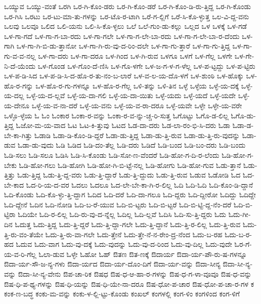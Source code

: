 {ಒಯ್ಯುವ
ಒಯ್ಯು-ವಂತೆ
ಒರಗಿ
ಒರ-ಗಿ-ಕೊಂ-ಡರು
ಒರ-ಗಿ-ಕೊಂ-ಡರೆ
ಒರ-ಗಿ-ಕೊಂ-ಡಿ-ರು-ತ್ತಿದ್ದ
ಒರ-ಗಿ-ಕೊಂಡು
ಒರ-ಗಿಸಿ
ಒರಟು
ಒರ-ಟು-ಮಾ-ತು-ಗಳನ್ನು
ಒರ-ಟೊ-ರ-ಟಾಗಿ
ಒರೆ-ಗ-ಲ್ಲಿಗೆ
ಒರೆ-ಸಿ-ಕೊ-ಳ್ಳುತ್ತ
ಒಲ-ವಿ-ದ್ದ-ವನು
ಒಲವು
ಒಲವೂ
ಒಲಿದ
ಒಲಿ-ಯನು
ಒಲಿ-ಸಿ-ಕೊ-ಳ್ಳಲು
ಒಲೆ
ಒಲೆ-ಗುಂ-ಡು-ಕಲ್ಲು
ಒಲ್ಲದ
ಒಳ
ಒಳಕ್ಕೆ
ಒಳ-ಗಡೆ
ಒಳ-ಗಾ-ಗದೆ
ಒಳ-ಗಾ-ಗ-ಬಾ-ರದು
ಒಳ-ಗಾ-ಗಲೇ
ಒಳ-ಗಾ-ಗ-ಲೇ-ಬಾ-ರದು
ಒಳ-ಗಾ-ಗ-ಲೇ-ಬಾ-ರ-ದೆಂದು
ಒಳ-ಗಾಗಿ
ಒಳ-ಗಾ-ಗಿ-ಬಿ-ಡು-ತ್ತಾನೋ
ಒಳ-ಗಾ-ಗಿ-ರು-ವು-ದ-ರಿಂ-ದಲೇ
ಒಳ-ಗಾ-ಗು-ತ್ತಾರೆ
ಒಳ-ಗಾ-ಗು-ತ್ತಿದ್ದ
ಒಳ-ಗಾ-ಗು-ವ-ವ-ನಲ್ಲ
ಒಳ-ಗಾ-ದರು
ಒಳ-ಗಾ-ದರೂ
ಒಳ-ಗಿಂದ
ಒಳ-ಗಿ-ರುವ
ಒಳಗೂ
ಒಳಗೆ
ಒಳ-ಗೆಲ್ಲ
ಒಳಗೇ
ಒಳ-ಗೇ-ನಿ-ದೆ-ಯೆಂದು
ಒಳ-ಗೊಂಡ
ಒಳ-ಗೊಂ-ದೆ-ಣಿಸಿ
ಒಳ-ಗೊ-ಳಗೇ
ಒಳ-ಜ-ಗ-ಳ-ಗ-ಳೆಲ್ಲ
ಒಳ-ಪ-ಟ್ಟದ್ದು
ಒಳ-ಪ-ಟ್ಟಿರು
ಒಳ-ಪ-ಡಿ-ಸಿದ
ಒಳ-ಪ-ಡಿ-ಸಿ-ದ-ಹೊ-ರ-ತು-ನಂ-ಬ-ಲಾರೆ
ಒಳ-ವ-ಲ-ಯ-ದೊ-ಳಗೆ
ಒಳ-ಶುಂಠಿ
ಒಳ-ಹೊಕ್ಕು
ಒಳ-ಹೊ-ರ-ಗನ್ನು
ಒಳ-ಹೊ-ರ-ಗು-ಗಳನ್ನೂ
ಒಳ-ಹೊ-ರ-ಗೆಲ್ಲ
ಒಳಿ-ತನ್ನು
ಒಳಿ-ತಿನ
ಒಳ್ಳೆ
ಒಳ್ಳೆಯ
ಒಳ್ಳೆ-ಯ-ದಕ್ಕೆ
ಒಳ್ಳೆ-ಯ-ದಲ್ಲ
ಒಳ್ಳೆ-ಯ-ದ-ಲ್ಲವೆ
ಒಳ್ಳೆ-ಯ-ದಾ-ಗಲಿ
ಒಳ್ಳೆ-ಯ-ದಾ-ಯಿತು
ಒಳ್ಳೆ-ಯದು
ಒಳ್ಳೆ-ಯದೆ
ಒಳ್ಳೆ-ಯದೇ
ಒಳ್ಳೆ-ಯ-ದೇನೂ
ಒಳ್ಳೆ-ಯ-ವ-ನಾ-ದರೆ
ಒಳ್ಳೆ-ಯ-ವನು
ಒಳ್ಳೆ-ಯ-ವ-ರಾ-ದರೂ
ಒಳ್ಳೆ-ಯವೇ
ಒಳ್ಳೇ
ಒಳ್ಳೇ-ಯ-ವರೇ
ಒಳ್ಳೊ-ಳ್ಳೆಯ
ಓ
ಓಂ
ಓಂಕಾರ
ಓಂಕಾ-ರ-ವನ್ನು
ಓಂಕಾ-ರ-ವ-ನ್ನು-ಚ್ಚ-ರಿ-ಸುತ್ತ
ಓಗೊಟ್ಟು
ಓಗೊ-ಡ-ಲಿಲ್ಲ
ಓಗೊ-ಡು-ತ್ತಿದ್ದ
ಓಜೋ-ಮ-ಯ-ವಾದ
ಓಟ
ಓಟ-ಕಿ-ತ್ತುವು
ಓಟದ
ಓಡ-ದಾ-ದರು
ಓಡ-ಲಾ-ರಂ-ಭಿ-ಸಿ-ದರು
ಓಡಾ
ಓಡಾ-ಡ-ಬೇ-ಕಾ-ಗಿತ್ತು
ಓಡಾಡಿ
ಓಡಾ-ಡಿ-ಕೊಂ-ಡಿ-ದ್ದರೆ
ಓಡಾ-ಡು-ತ್ತಿದ್ದ
ಓಡಾ-ಡು-ತ್ತಿ-ರುವ
ಓಡಾ-ಡು-ತ್ತಿ-ರು-ವುದನ್ನು
ಓಡಾ-ಡುವ
ಓಡಾ-ಡು-ವುದು
ಓಡಿ
ಓಡಿದ
ಓಡಿ-ದಂ-ತೆಲ್ಲ
ಓಡಿ-ದರು
ಓಡಿದೆ
ಓಡಿ-ಬಂದ
ಓಡಿ-ಬಂ-ದರು
ಓಡಿ-ಬಂದು
ಓಡಿ-ಸಲು
ಓಡಿ-ಸಲೂ
ಓಡಿಸಿ
ಓಡಿ-ಸಿ-ಕೊಂಡು
ಓಡಿ-ಸೋ-ಣ-ವೆಂದರೆ
ಓಡಿ-ಹೋ-ಗ-ದಿ-ರ-ಲೆಂದು
ಓಡಿ-ಹೋ-ಗ-ಬೇಕು
ಓಡಿ-ಹೋ-ಗಲು
ಓಡಿ-ಹೋಗಿ
ಓಡಿ-ಹೋ-ಗಿ-ಬಿ-ಟ್ಟೆ-ನಲ್ಲ
ಓಡಿ-ಹೋಗು
ಓಡಿ-ಹೋ-ಗುವ
ಓಡು-ತ್ತಾನೆ
ಓಡು-ತ್ತಿತ್ತು
ಓಡು-ತ್ತಿದ್ದ
ಓಡು-ತ್ತಿ-ದ್ದ-ವರು
ಓಡು-ತ್ತಿ-ದ್ದಾರೆ
ಓಡು-ತ್ತಿ-ದ್ದುದು
ಓಡು-ತ್ತಿ-ರುವ
ಓಡುವ
ಓಡೋಡಿ
ಓದ
ಓದ-ಬೇ-ಕಾದ
ಓದ-ರಿ-ಯ-ದ-ವರ
ಓದಲು
ಓದಲೂ
ಓದ-ಲೇ-ಬೇ-ಕಾ-ಗಿ-ರ-ಲಿಲ್ಲ
ಓದಿ
ಓದಿ-ಓದಿ
ಓದಿ-ಕೊಂ-ಡಿ-ದ್ದಾನೆ
ಓದಿ-ಕೊಂಡು
ಓದಿ-ಕೊ-ಳ್ಳು-ತ್ತಿ-ದ್ದಾಗ
ಓದಿದ
ಓದಿ-ದರೆ
ಓದಿ-ದಾ-ಗಲೂ
ಓದಿ-ದ್ದರು
ಓದಿ-ದ್ದೀರೋ
ಓದಿದ್ದು
ಓದಿದ್ದೇ
ಓದಿ-ದ್ದೇನೆ
ಓದಿನ
ಓದಿ-ನೋಡಿ
ಓದಿ-ಬ-ರೆ-ಯುವ
ಓದಿ-ಬಿ-ಟ್ಟರು
ಓದಿ-ಬಿ-ಟ್ಟರೆ
ಓದಿ-ಬಿ-ಟ್ಟಿ-ದ್ದ-ನೆಂ-ದರೆ
ಓದಿ-ಬಿ-ಟ್ಟಿರಾ
ಓದಿಯೇ
ಓದಿ-ರ-ಲಿಲ್ಲ
ಓದಿ-ರು-ವು-ದ-ನ್ನೆಲ್ಲ
ಓದಿಲ್ಲ
ಓದಿ-ಲ್ಲವೆ
ಓದಿಸಿ
ಓದಿ-ಸು-ತ್ತಿ-ದ್ದರು
ಓದು
ಓದು-ಗೀ-ದಿನ
ಓದುತ್ತ
ಓದು-ತ್ತಿದ್ದ
ಓದು-ತ್ತಿ-ದ್ದರೆ
ಓದು-ತ್ತಿ-ದ್ದಾ-ಗಲೇ
ಓದು-ತ್ತಿ-ದ್ದಾನೆ
ಓದು-ತ್ತಿ-ರ-ಲಿಲ್ಲ
ಓದು-ತ್ತಿ-ರುವ
ಓದು-ತ್ತಿ-ರು-ವಂ-ತೆಯೇ
ಓದು-ತ್ತಿ-ರು-ವಾ-ಗಲೇ
ಓದು-ತ್ತೇನೆ
ಓದು-ತ್ತೇ-ನೆ-ನ-ರೇಂ-ದ್ರ-ನೆಂದ
ಓದು-ಬ-ರಹ
ಓದು-ಬ-ರ-ಹದ
ಓದುವ
ಓದು-ವಾಗ
ಓದು-ವು-ದಕ್ಕೆ
ಓದು-ವುದನ್ನು
ಓದು-ವು-ದ-ರಿಂದ
ಓದು-ವು-ದಿಲ್ಲ
ಓದು-ವುದೇ
ಓರ-ಗೆ-ಯ-ವ-ರಿ-ಗೆಲ್ಲ
ಓಲಾ-ಡುವ
ಓಳ್ಳೇ
ಓಹೋ
ಓಹ್
ಔತಣ
ಔತ-ಣಕ್ಕೆ
ಔದಾರ್ಯ
ಔದಾ-ರ್ಯ-ಪೌ-ರು-ಷ-ಗಳನ್ನೂ
ಔದಾ-ರ್ಯ-ಸೌ-ಜ-ನ್ಯ-ಗಳು
ಔದಾ-ರ್ಯದ
ಔದಾ-ರ್ಯ-ದೊಂ-ದಿಗೆ
ಔದಾ-ರ್ಯ-ವನ್ನು
ಔದಾ-ಸೀನ್ಯ
ಔದಾ-ಸೀ-ನ್ಯ-ವನ್ನು
ಔದಾ-ಸೀ-ನ್ಯ-ವೇನು
ಔಪ-ಚಾ-ರಿಕ
ಔಷಧ
ಔಷ-ಧ-ಆ-ಹಾ-ರ-ಗಳನ್ನು
ಔಷ-ಧ-ಗ-ಳಾ-ವೂವೂ
ಔಷ-ಧ-ವನ್ನು
ಔಷ-ಧಿ-ಪ-ಥ್ಯ-ಗಳನ್ನು
ಔಷ-ಧಿ-ಯನ್ನು
ಔಷ-ಧಿ-ಯೇ-ನಾ-ದರೂ
ಔಷ-ಧೋ-ಪ-ಚಾರ
ಔಷ-ಧೋ-ಪ-ಚಾ-ರ-ಗಳ
ಕ
ಕಂಕ-ಣ-ಬದ್ಧ
ಕಂಕು-ಮ-ವನ್ನು
ಕಂಕು-ಳ-ಲ್ಲಿ-ಟ್ಟು-ಕೊಂಡು
ಕಂಖಲ್
ಕಂಗಳಲ್ಲಿ
ಕಂಗ-ಳಿಂ
ಕಂಗಳಿಂದ
ಕಂಗ-ಳಿಗೆ
}
